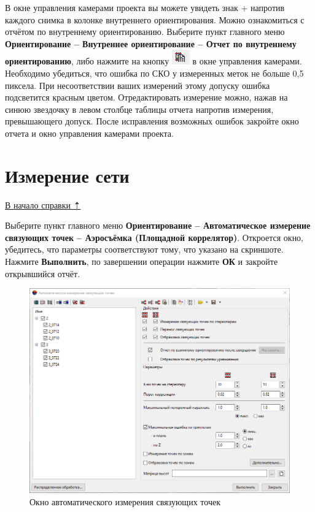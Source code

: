 \documentclass[
  12pt,
]{book}
\begin{document}
В окне управления камерами проекта вы можете увидеть знак + напротив каждого снимка в колонке внутреннего ориентирования. Можно ознакомиться с отчётом по внутреннему ориентированию. Выберите пункт главного меню \textbf{Ориентирование -- Внутреннее ориентирование -- Отчет по внутреннему ориентированию}, либо нажмите на кнопку \includegraphics{images/Ref15/Report_IO.png} в окне управления камерами. Необходимо убедиться, что ошибка по СКО у измеренных меток не больше 0,5 пиксела. При несоответствии ваших измерений этому допуску ошибка подсветится красным цветом. Отредактировать измерение можно, нажав на синюю звездочку в левом столбце таблицы отчета напротив измерения, превышающего допуск. После исправления возможных ошибок закройте окно отчета и окно управления камерами проекта.

\hypertarget{photomod-network_measurements}{%
\section{Измерение сети}\label{photomod-network_measurements}}

\protect\hyperlink{photomod}{В начало справки ⇡}

Выберите пункт главного меню \textbf{Ориентирование -- Автоматическое измерение связующих точек -- Аэросъёмка (Площадной коррелятор)}. Откроется окно, убедитесь, что параметры соответствуют тому, что указано на скриншоте. Нажмите \textbf{Выполнить}, по завершении операции нажмите \textbf{ОК} и закройте открывшийся отчёт.

\begin{figure}
\centering
\includegraphics{images/Ref15/Tie_Points.png}
\caption{Окно автоматического измерения связующих точек}
\end{figure}
\end{document}
